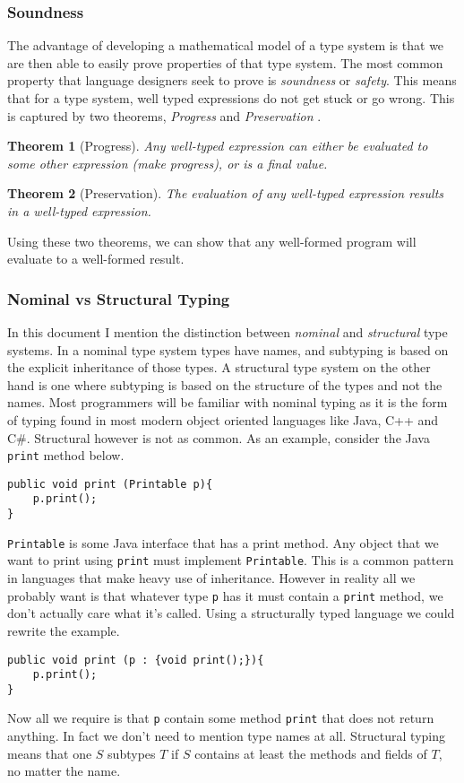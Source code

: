 \documentclass[11pt
              , a4paper
              , twoside
              , openright
              ]{report}
\newtheorem{theorem}{Theorem}
\numberwithin{case}{theorem}
\numberwithin{subcase}{case}
\begin{document}
\subsubsection{Soundness}
The advantage of developing a mathematical model of a type system is that we are then able to easily prove properties of that type system. The most common property that language designers seek to prove is \emph{soundness} or \emph{safety}. This means that for a type system, well typed expressions do not get stuck or go wrong. This is captured by two theorems, \emph{Progress} and \emph{Preservation} \cite{Wright:1994:SAT:191905.191909, Pierce:2002:TPL:509043}.
\begin{theorem}[Progress]\label{th:progress}
Any well-typed expression can either be evaluated to some other expression (make progress), or is a final value.
\end{theorem}
\begin{theorem}[Preservation]\label{th:preservation}
The evaluation of any well-typed expression results in a well-typed expression.
\end{theorem}
Using these two theorems, we can show that any well-formed program will evaluate to a well-formed result.


\subsubsection{Nominal vs Structural Typing}
In this document I mention the distinction between \emph{nominal} and \emph{structural} type systems. In a nominal type system types have names, and subtyping is based on the explicit inheritance of those types. A structural type system on the other hand is one where subtyping is based on the structure of the types and not the names. Most programmers will be familiar with nominal typing as it is the form of typing found in most modern object oriented languages like Java, C++ and C\#. Structural however is not as common. As an example, consider the Java \verb|print| method below.
\begin{lstlisting}[mathescape, style=custom_lang]
public void print (Printable p){
	p.print();
}
\end{lstlisting}
\verb|Printable| is some Java interface that has a print method. Any object that we want to print using \verb|print| must implement \verb|Printable|. This is a common pattern in languages that make heavy use of inheritance. However in reality all we probably want is that whatever type \verb|p| has it must contain a \verb|print| method, we don't actually care what it's called. Using a structurally typed language we could rewrite the example.
\begin{lstlisting}[mathescape, style=custom_lang]
public void print (p : {void print();}){
	p.print();
}
\end{lstlisting}
Now all we require is that \verb|p| contain some method \verb|print| that does not return anything. In fact we don't need to mention type names at all.   Structural typing means that one $S$ subtypes $T$ if $S$ contains at least the methods and fields of $T$, no matter the name.
\end{document}
